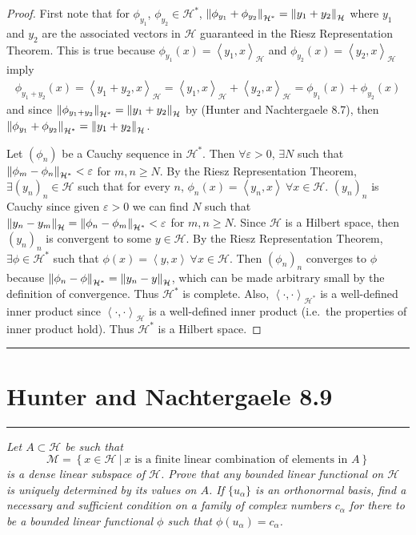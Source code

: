 \documentclass{article} %
\theoremstyle{plain}
\newcommand{\E}{\varepsilon}
\newcommand{\VEC}[2]{\left\langle #1, #2 \right\rangle}
\newcommand{\problem}[1]{
\vspace{.375cm}
\begin{minipage}{\textwidth}
    \begin{center}
        \noindent\rule{5cm}{1pt}
    \end{center}
    \section{\bf #1}
    \begin{center}
        \noindent\rule{5cm}{1pt}
    \end{center}
    \vspace{0.25cm}
\end{minipage}
}
\numberwithin{equation}{section} %
\numberwithin{figure}{section} %
\numberwithin{table}{section} %
\begin{document}
\begin{proof}
    First note that for $\phi_{y_1}$, $\phi_{y_2} \in \mathcal{H}^*$, $\norm{\phi_{y_1} + \phi_{y_2}}_{\mathcal{H}^*} = \norm{y_1 + y_2}_{\mathcal{H}}$ where $y_1$ and $y_2$ are the associated vectors in $\mathcal{H}$ guaranteed in the Riesz Representation Theorem.  This is true because $\phi_{y_1}(x) = \VEC{y_1}{x}_{\mathcal{H}}$ and $\phi_{y_2}(x) = \VEC{y_2}{x}_{\mathcal{H}}$ imply
    \begin{align*}
         \phi_{y_1 + y_2}(x) = \VEC{y_1 + y_2}{x}_{\mathcal{H}} = \VEC{y_1}{x}_{\mathcal{H}} + \VEC{y_2}{x}_{\mathcal{H}} = \phi_{y_1}(x) + \phi_{y_2}(x)
    \end{align*}
    and since $\norm{\phi_{y_1 + y_2}}_{\mathcal{H}^*} = \norm{y_1 + y_2}_{\mathcal{H}}$ by (Hunter and Nachtergaele 8.7), then $\norm{\phi_{y_1} + \phi_{y_2}}_{\mathcal{H}^*} = \norm{y_1 + y_2}_{\mathcal{H}}$.

    Let $(\phi_n)$ be a Cauchy sequence in $\mathcal{H}^*$.  Then $\forall \E > 0$, $\exists N$ such that $\norm{\phi_m - \phi_n}_{\mathcal{H}^*} < \E$ for $m, n \geq N$.  By the Riesz Representation Theorem, $\exists (y_n)_n \in \mathcal{H}$ such that for every $n$, $\phi_n(x) = \VEC{y_n}{x}\ \forall x \in \mathcal{H}$.  $(y_n)_n$ is Cauchy since given $\E > 0$ we can find $N$ such that $\norm{y_n - y_m}_{\mathcal{H}} = \norm{\phi_n - \phi_m}_{\mathcal{H}^*} < \E$ for $m, n \geq N$.  Since $\mathcal{H}$ is a Hilbert space, then $(y_n)_n$ is convergent to some $y \in \mathcal{H}$.  By the Riesz Representation Theorem, $\exists \phi \in \mathcal{H}^*$ such that $\phi(x) = \VEC{y}{x}\ \forall x \in \mathcal{H}$.  Then $(\phi_n)_n$ converges to $\phi$ because $\norm{\phi_n - \phi}_{\mathcal{H}^*} = \norm{y_n - y}_\mathcal{H}$, which can be made arbitrary small by the definition of convergence.  Thus $\mathcal{H}^*$ is complete.  Also, $\VEC{\cdot}{\cdot}_{\mathcal{H}^*}$ is a well-defined inner product since $\VEC{\cdot}{\cdot}_\mathcal{H}$ is a well-defined inner product (i.e.~the properties of inner product hold).  Thus $\mathcal{H}^*$ is a Hilbert space.
\end{proof}









\problem{Hunter and Nachtergaele 8.9}
\emph{Let $A \subset \mathcal{H}$ be such that $$\mathcal{M} = \left\{x \in \mathcal{H}\ |\ x \text{ is a finite linear combination of elements in $A$}\right\}$$ is a dense linear subspace of $\mathcal{H}$.  Prove that any bounded linear functional on $\mathcal{H}$ is uniquely determined by its values on $A$.  If $\{u_\alpha\}$ is an orthonormal basis, find a necessary and sufficient condition on a family of complex numbers $c_\alpha$ for there to be a bounded linear functional $\phi$ such that $\phi(u_\alpha) = c_\alpha$.} \\
\end{document}

